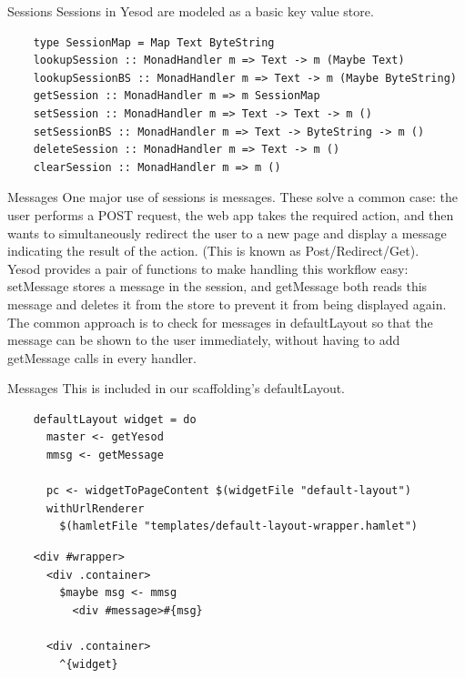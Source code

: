 \documentclass[pdf]{beamer}
\begin{document}
\begin{frame}[fragile]{Sessions}
  Sessions in Yesod are modeled as a basic key value store. \\

  \begin{verbatim}
    type SessionMap = Map Text ByteString
    lookupSession :: MonadHandler m => Text -> m (Maybe Text)
    lookupSessionBS :: MonadHandler m => Text -> m (Maybe ByteString)
    getSession :: MonadHandler m => m SessionMap
    setSession :: MonadHandler m => Text -> Text -> m ()
    setSessionBS :: MonadHandler m => Text -> ByteString -> m ()
    deleteSession :: MonadHandler m => Text -> m ()
    clearSession :: MonadHandler m => m ()
  \end{verbatim}
\end{frame}

\begin{frame}{Messages}
  One major use of sessions is messages. These solve a common case:
  the user performs a POST request, the web app takes the required
  action, and then wants to simultaneously redirect the user to a new
  page and display a message indicating the result of the
  action. (This is known as Post/Redirect/Get). \\

  Yesod provides a pair of functions to make handling this workflow
  easy: setMessage stores a message in the session, and getMessage
  both reads this message and deletes it from the store to prevent it
  from being displayed again. \\

  The common approach is to check for messages in defaultLayout so
  that the message can be shown to the user immediately, without
  having to add getMessage calls in every handler.
\end{frame}

\begin{frame}[fragile]{Messages}
  This is included in our scaffolding's defaultLayout. \\

  \begin{verbatim}
    defaultLayout widget = do
      master <- getYesod
      mmsg <- getMessage

      pc <- widgetToPageContent $(widgetFile "default-layout")
      withUrlRenderer
        $(hamletFile "templates/default-layout-wrapper.hamlet")
  \end{verbatim}
  \vspace{0.5em}
  \begin{verbatim}
    <div #wrapper>
      <div .container>
        $maybe msg <- mmsg
          <div #message>#{msg}

      <div .container>
        ^{widget}
  \end{verbatim}
\end{frame}
\end{document}
